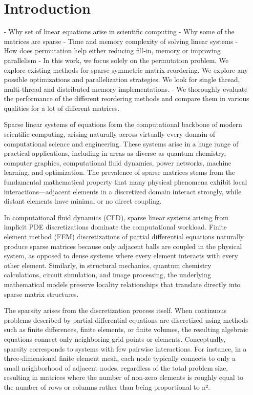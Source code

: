 \chapter{Introduction}
\label{ch:introduction}


- Why set of linear equations arise in scientific computing
- Why some of the matrices are sparse
- Time and memory complexity of solving linear systems
- How does permutation help either reducing fill-in, memory or improving parallelism
- In this work, we focus solely on the permutation problem. We explore existing methods for sparse symmetric matrix reordering. We explore any possible optimizations and parallelization strategies. We look for single thread, multi-thread and distributed memory implementations.
- We thoroughly evaluate the performance of the different reordering methods and compare them in various qualities for a lot of different matrices.

Sparse linear systems of equations form the computational backbone of modern scientific computing, arising naturally across virtually every domain of computational science and engineering. These systems arise in a huge range of practical applications, including in areas as diverse as quantum chemistry, computer graphics, computational fluid dynamics, power networks, machine learning, and optimization. The prevalence of sparse matrices stems from the fundamental mathematical property that many physical phenomena exhibit local interactions—adjacent elements in a discretized domain interact strongly, while distant elements have minimal or no direct coupling.

In computational fluid dynamics (CFD), sparse linear systems arising from implicit PDE discretizations dominate the computational workload. Finite element method (FEM) discretizations of partial differential equations naturally produce sparse matrices because only adjacent balls are coupled in the physical system, as opposed to dense systems where every element interacts with every other element. Similarly, in structural mechanics, quantum chemistry calculations, circuit simulation, and image processing, the underlying mathematical models preserve locality relationships that translate directly into sparse matrix structures.

The sparsity arises from the discretization process itself. When continuous problems described by partial differential equations are discretized using methods such as finite differences, finite elements, or finite volumes, the resulting algebraic equations connect only neighboring grid points or elements. Conceptually, sparsity corresponds to systems with few pairwise interactions. For instance, in a three-dimensional finite element mesh, each node typically connects to only a small neighborhood of adjacent nodes, regardless of the total problem size, resulting in matrices where the number of non-zero elements is roughly equal to the number of rows or columns rather than being proportional to n².

